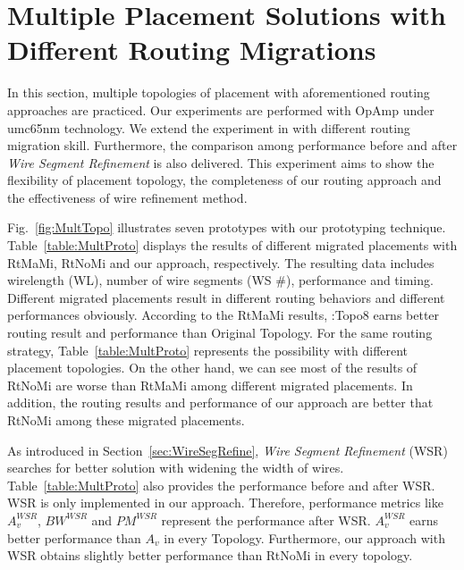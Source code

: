   \section{Multiple Placement Solutions with Different Routing Migrations}\label{sec:ExpMultiProto}

    In this section, multiple topologies of placement with aforementioned routing approaches are practiced. Our experiments are performed with OpAmp under umc65nm technology. 
    We extend the experiment in \cite{Chin_DMR_ICCAD2013} with different routing migration skill. Furthermore, the comparison among performance before and after {\it Wire Segment Refinement} is also delivered. This experiment aims to show the flexibility of placement topology, the completeness of our routing approach and the effectiveness of wire refinement method.

    Fig.~\ref{fig:MultTopo} illustrates seven prototypes with our prototyping technique. Table~\ref{table:MultProto} displays the results of different migrated placements with RtMaMi, RtNoMi and our approach, respectively. The resulting data includes wirelength (WL), number of wire segments (WS \#), performance and timing. Different migrated placements result in different routing behaviors and different performances obviously. According to the RtMaMi results, \cite{ALP_YPWeng_iccad2011}:Topo8 earns better routing result and performance than Original Topology. For the same routing strategy, Table~\ref{table:MultProto} represents the possibility with different placement topologies. On the other hand, we can see most of the results of RtNoMi are worse than RtMaMi among different migrated placements. In addition, the routing results and performance of our approach are better that RtNoMi among these migrated placements. 

    As introduced in Section~\ref{sec:WireSegRefine}, {\it Wire Segment Refinement} (WSR) searches for better solution with widening the width of wires. Table~\ref{table:MultProto} also provides the performance before and after WSR. WSR is only implemented in our approach. Therefore, performance metrics like $A_v^{WSR}$, $BW^{WSR}$ and $PM^{WSR}$ represent the performance after WSR. $A_v^{WSR}$ earns better performance than $A_v$ in every Topology. Furthermore, our approach with WSR obtains slightly better performance than RtNoMi in every topology.

